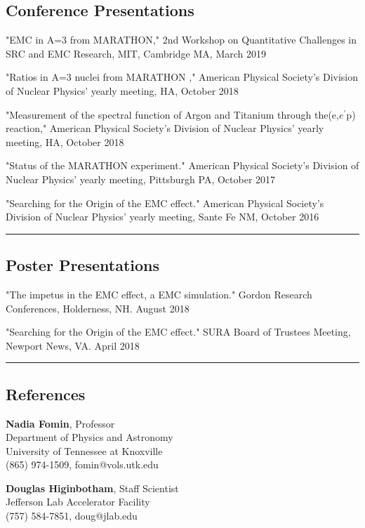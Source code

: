 \documentclass[12pt,letterpaper]{article}
\begin{document}
\subsection*{Conference Presentations}
\begin{itemize*}
	\item "EMC in A=3 from MARATHON," 2nd Workshop on Quantitative Challenges in SRC and EMC Research,  MIT, Cambridge MA,  March 2019
	\item "Ratios in A=3 nuclei from MARATHON ," American Physical Society's Division of Nuclear Physics' yearly meeting, HA, October 2018
	\item "Measurement of the spectral function of Argon and Titanium through the(e,$e^\prime$p) reaction," American Physical Society's Division of Nuclear Physics' yearly meeting, HA, October 2018
	\item "Status of the MARATHON experiment." American Physical Society's Division of Nuclear Physics' yearly meeting, Pittsburgh PA, October 2017
	\item "Searching for the Origin of the EMC effect." American Physical Society's Division of Nuclear Physics' yearly meeting, Sante Fe NM, October 2016
\end{itemize*}

\hrule
\subsection*{Poster Presentations}
\begin{itemize*}
	\item "The impetus in the EMC effect, a EMC simulation." Gordon Research Conferences, Holderness, NH. August 2018 
	\item "Searching for the Origin of the EMC effect." SURA Board of Trustees Meeting, Newport News, VA. April 2018 
\end{itemize*}
\hrule
\subsection*{References}
\begin{multicols}{2}
	{\bf{Nadia Fomin}}, Professor\\
	Department of Physics and Astronomy\\ 
	University of Tennessee at Knoxville\\
	(865) 974-1509, fomin@vols.utk.edu\\
	\columnbreak
	
	{\bf{Douglas Higinbotham}}, Staff Scientist\\
	Jefferson Lab Accelerator Facility\\
	(757) 584-7851, doug@jlab.edu\\
\end{multicols}
\end{document}
